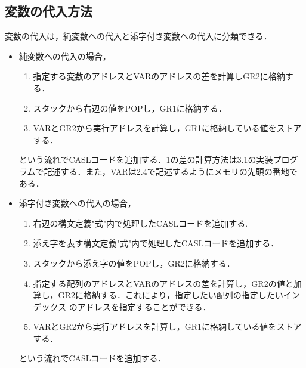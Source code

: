 \documentclass[dvipdfmx]{jarticle}
\begin{document}
\subsection{変数の代入方法}
変数の代入は，純変数への代入と添字付き変数への代入に分類できる．
\begin{itemize}
  \item 純変数への代入の場合，
  \begin{enumerate}
    \item 指定する変数のアドレスとVARのアドレスの差を計算しGR2に格納する．
    \item スタックから右辺の値をPOPし，GR1に格納する．
    \item VARとGR2から実行アドレスを計算し，GR1に格納している値をストアする．
  \end{enumerate}
  という流れでCASLコードを追加する．1の差の計算方法は3.1の実装プログラムで記述する．また，VARは2.4で記述するようにメモリの先頭の番地である．
  \item 添字付き変数への代入の場合，
  \begin{enumerate}
    \item 右辺の構文定義"式"内で処理したCASLコードを追加する.
    \item 添え字を表す構文定義"式"内で処理したCASLコードを追加する．
    \item スタックから添え字の値をPOPし，GR2に格納する．
    \item 指定する配列のアドレスとVARのアドレスの差を計算し，GR2の値と加算し，GR2に格納する．これにより，指定したい配列の指定したいインデックス
    のアドレスを指定することができる．
    \item VARとGR2から実行アドレスを計算し，GR1に格納している値をストアする．
  \end{enumerate}
  という流れでCASLコードを追加する．
\end{itemize}
\end{document}
